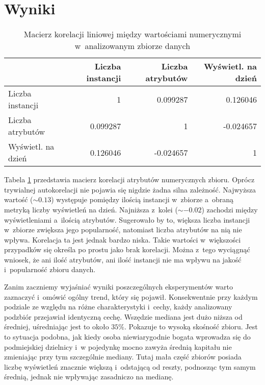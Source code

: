 \section{Wyniki}

\begin{center}
      \begin{table}[ht]
        \begin{tabular}{|l|rrr|}
          \hline
                              & Liczba instancji & Liczba atrybutów & Wyświetl. na dzień \\
          \hline
          Liczba instancji    & 1                & 0.099287         & 0.126046           \\
          Liczba atrybutów    & 0.099287         & 1                & -0.024657          \\
          Wyświetl. na dzień  & 0.126046         & -0.024657        & 1                  \\
          \hline
        \end{tabular}
        \caption{Macierz korelacji liniowej między wartościami numerycznymi w~analizowanym zbiorze danych}
        \label{tab:correlation}
      \end{table}
    \end{center}

Tabela \ref{tab:correlation} przedstawia macierz korelacji atrybutów numerycznych zbioru.
Oprócz trywialnej autokorelacji nie pojawia się nigdzie żadna silna zależność.
Najwyższa wartość (\(\sim 0.13\)) występuje pomiędzy ilością instancji w~zbiorze a~obraną metryką liczby wyświetleń na dzień.
Najniższa z~kolei (\(\sim -0.02\)) zachodzi między wyświetleniami a~ilością atrybutów.
Sugerowało by to, większa liczba instancji w~zbiorze zwiększa jego popularność, natomiast liczba atrybutów na nią nie wpływa.
Korelacja ta jest jednak bardzo niska.
Takie wartości w~większości przypadków się określa po prostu jako brak korelacji.
Można z~tego wyciągnąć wniosek, że ani ilość atrybutów, ani ilość instancji nie ma wpływu na jakość i~popularność zbioru danych.

Zanim zaczniemy wyjaśniać wyniki poszczególnych eksperymentów warto zaznaczyć i~omówić ogólny trend, który się pojawił.
Konsekwentnie przy każdym podziale ze względu na różne charakterystyki i~cechy, każdy analizowany podzbiór przejawiał identyczną cechę.
Wszędzie mediana jest dużo niższa od średniej, uśredniając jest to około \(35\%\).
Pokazuje to wysoką skośność zbioru.
Jest to sytuacja podobna, jak kiedy osoba niewiarygodnie bogata wprowadza się do podmiejskiej dzielnicy i~w pojedynkę mocno zawyża średnią kapitału nie zmieniając przy tym szczególnie mediany.
Tutaj mała część zbiorów posiada liczbę wyświetleń znacznie większą i~odstającą od reszty, podnosząc tym samym średnią, jednak nie wpływając zasadniczo na medianę.

